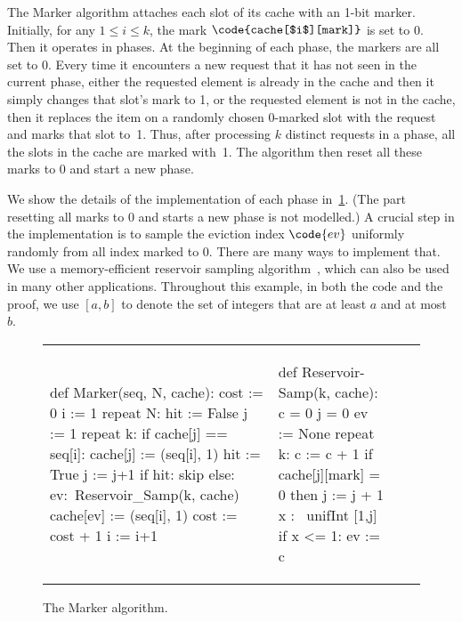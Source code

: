 \documentclass[acmsmall,nonacm,screen,appendix]{acmart}
\begin{document}
The Marker algorithm attaches each slot of its cache with an 1-bit marker.
Initially, for any $1 \leq i \leq k$, the mark
$\code{cache[$i$][mark]}$ is set to 0.
Then it operates in phases.
At the beginning of each phase, the markers are all set to 0.
Every time it encounters a new request that
it has not seen in the current phase,
either the requested element is already in the cache and then
it simply changes that slot's mark to 1,
or the requested element is not in the cache,
then it replaces the item on a randomly chosen 0-marked slot with the request
and marks that slot to~1.
Thus, after processing $k$ distinct requests in a phase,
all the slots in the cache are marked with~1.
 The algorithm then reset all
these marks to 0 and start a new phase.

We show the details of the implementation of each phase in~\cref{fig:marker:algorithm}.
(The part resetting all marks to 0 and starts a new phase is not modelled.)
A crucial step in the implementation is to sample the eviction index $\code{ev}$
uniformly randomly from all index marked to 0.
There are many ways to implement that. We use a memory-efficient reservoir sampling algorithm~\cite{vitter1985random}, which can also be used in many other applications.
Throughout this example, in both the code and the proof, we use $[a, b]$ to denote the set of integers
that are at least $a$ and at most $b$.

\begin{figure}
\setlength\tabcolsep{0pt}\begin{tabular*}{\textwidth}{
    @{\extracolsep{\fill}}
    *{4}{p{}}@{}
  }
  \begin{sourcecode*}
  def Marker(seq, N, cache):
    cost := 0
    i := 1
    repeat N:
       hit := False
       j := 1
       repeat k:
	       if cache[j]  == seq[i]:
		        cache[j] := (seq[i], 1)
		        hit := True
	       j := j+1
	    if hit:
		    skip
		  else:
        ev:~Reservoir_Samp(k, cache)
		  	cache[ev] := (seq[i], 1)
		    cost := cost + 1
      i := i+1
  \end{sourcecode*}
  &
  \begin{sourcecode*}
    def Reservoir-Samp(k, cache):
        c = 0
        j = 0
        ev := None
        repeat k:
          c := c + 1
          if cache[j][mark] = 0 then
            j := j + 1
            x :~ unifInt [1,j]
            if x <= 1:
              ev := c
  \end{sourcecode*}
\end{tabular*}
  \caption{The Marker algorithm.}
  \label{fig:marker:algorithm}
\end{figure}
\end{document}
